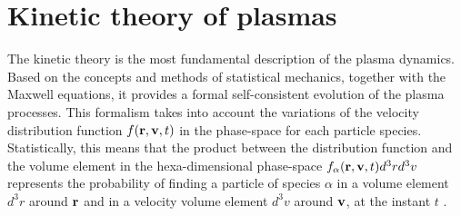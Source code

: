 \documentclass[12pt,a4paper,ruledheader]{report}
\begin{document}
\chapter{Kinetic theory of plasmas}
\label{sec:kin-theo}





The kinetic theory is the most fundamental description of the
plasma dynamics. Based on the concepts and methods of statistical
mechanics, together with the Maxwell equations, it provides a
formal self-consistent evolution of the plasma processes. This
formalism takes into account the variations of the velocity
distribution function $f({\bf r},{\bf v},t)$ in the phase-space
for each particle species. Statistically, this means that the
product between the distribution function and the volume element
in the hexa-dimensional phase-space $f_\alpha({\bf r},{\bf v},t)d^3r d^3v$
represents the probability of finding a particle of species
$\alpha$ in a volume element $d^3r$ around ${\bf r}$ and in a
velocity volume element $d^3v$ around ${\bf v}$, at the instant
$t$ \cite{klimo,klimon}.
\end{document}
